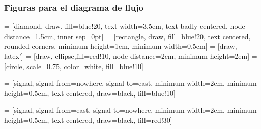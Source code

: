 \documentclass[a4paper,12pt,spanish]{article}
\begin{document}
\subsubsection{Figuras para el diagrama de flujo}
\label{sec:ciclo-de-vida}




 = [diamond, draw, fill=blue!20, 
    text width=3.5em, text badly centered, node distance=1.5cm, inner sep=0pt]
 = [rectangle, draw, fill=blue!20, text centered, rounded corners, minimum
    height=1em, minimum width=0.5cm]
 = [draw, -latex']
 = [draw, ellipse,fill=red!10, node distance=2cm,
minimum height=2em]
=[circle, scale=0.75, color=white, fill=blue!10]


     = [signal, signal from=nowhere, signal to=east, minimum width=2cm, minimum height=0.5cm, text centered, draw=black, fill=blue!10]

     = [signal, signal from=east, signal to=nowhere, minimum width=2cm, minimum height=0.5cm, text centered, draw=black, fill=red!30]
    
\end{document}
